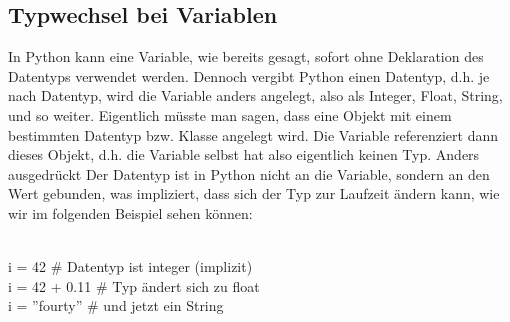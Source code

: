 \subsection{Typwechsel bei Variablen}
In Python kann eine Variable, wie bereits gesagt, sofort ohne Deklaration des Datentyps verwendet werden. Dennoch vergibt Python einen Datentyp, d.h. je nach Datentyp, wird die Variable anders angelegt, also als Integer, Float, String, und so weiter. Eigentlich müsste man sagen, dass eine Objekt mit einem bestimmten Datentyp bzw. Klasse angelegt wird. Die Variable referenziert dann dieses Objekt, d.h. die Variable selbst hat also eigentlich keinen Typ. Anders ausgedrückt
Der Datentyp ist in Python nicht an die Variable, sondern an den Wert gebunden, was impliziert, dass sich der Typ zur Laufzeit ändern kann, wie wir im folgenden Beispiel sehen können:\\
\\
\begin{MyConsoleBox}{
i = 42         \hspace{1.5cm} \# Datentyp ist integer (implizit) \\
i = 42 + 0.11  \hspace{0.52cm}\# Typ ändert sich zu float \\
i = ''fourty'' \hspace{0.6cm} \# und jetzt ein String   \\
}\end{MyConsoleBox}
\\
